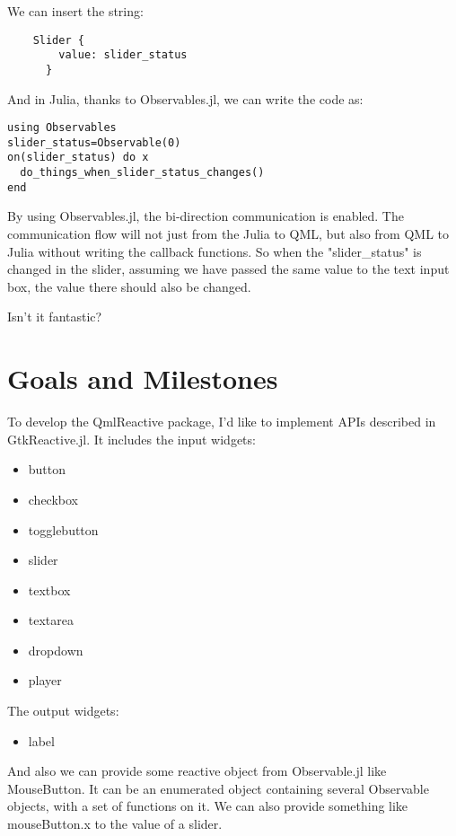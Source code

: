 \documentclass[12pt]{extarticle}
\begin{document}
We can insert the string:
\begin{verbatim}
    Slider {
        value: slider_status
      }    
\end{verbatim}

And in Julia, thanks to Observables.jl, we can write the code as:
\begin{verbatim}
using Observables
slider_status=Observable(0)
on(slider_status) do x
  do_things_when_slider_status_changes()
end
\end{verbatim}

By using Observables.jl, the bi-direction communication is enabled. The communication flow will not just from the Julia to QML, but also from QML to Julia
without writing the callback functions. So when the "slider\_status" is changed in the slider, assuming we have passed the same value to the text input box, 
the value there should also be changed.

Isn't it fantastic?

\section{Goals and Milestones}

To develop the QmlReactive package, I'd like to implement APIs described in GtkReactive.jl. 
It includes the input widgets:
\begin{itemize}
    \item button
    \item checkbox
    \item togglebutton
    \item slider
    \item textbox
    \item textarea
    \item dropdown
    \item player
\end{itemize}

The output widgets:
\begin{itemize}
    \item label
\end{itemize}

And also we can provide some reactive object from Observable.jl like MouseButton. It can be an enumerated object containing 
several Observable objects, with a set of functions on it. We can also provide something like
mouseButton.x to the value of a slider.
\end{document}
